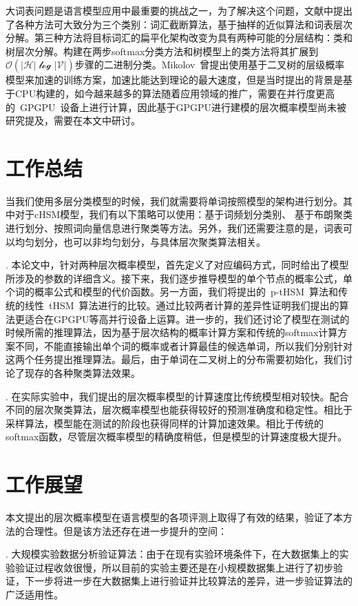 \summary
大词表问题是语言模型应用中最重要的挑战之一，为了解决这个问题，文献中提出了各种方法可大致分为三个类别：词汇截断算法，基于抽样的近似算法和词表层次分解。第三种方法将目标词汇的扁平化架构改变为具有两种可能的分层结构：类和树层次分解。构建在两步softmax分类方法和树模型上的类方法将其扩展到$\mathcal {O(| H | \log | V |)} $步骤的二进制分类。Mikolov~曾提出使用基于二叉树的层级概率模型来加速的训练方案，加速比能达到理论的最大速度，但是当时提出的背景是基于CPU构建的，如今越来越多的算法随着应用领域的推广，需要在并行度更高的~GPGPU~设备上进行计算，因此基于GPGPU进行建模的层次概率模型尚未被研究提及，需要在本文中研讨。
\section*{工作总结}
当我们使用多层分类模型的时候，我们就需要将单词按照模型的架构进行划分。其中对于cHSM模型，我们有以下策略可以使用：基于词频划分类别、 基于布朗聚类进行划分、按照词向量信息进行聚类等方法。另外，我们还需要注意的是，词表可以均匀划分，也可以非均匀划分，与具体层次聚类算法相关。


. 本论文中，针对两种层次概率模型，首先定义了对应编码方式，同时给出了模型所涉及的参数的详细含义。接下来，我们逐步推导模型的单个节点的概率公式，单个词的概率公式和模型的代价函数。另一方面，我们将提出的~p-tHSM~算法和传统的线性~tHSM~算法进行的比较。通过比较两者计算的差异性证明我们提出的算法更适合在GPGPU等高并行设备上运算。进一步的，我们还讨论了模型在测试的时候所需的推理算法，因为基于层次结构的概率计算方案和传统的softmax计算方案不同，不能直接输出单个词的概率或者计算最佳的候选单词，所以我们分别针对这两个任务提出推理算法。最后，由于单词在二叉树上的分布需要初始化，我们讨论了现存的各种聚类算法效果。

. 在实际实验中，我们提出的层次概率模型的计算速度比传统模型相对较快。配合不同的层次聚类算法，层次概率模型也能获得较好的预测准确度和稳定性。相比于采样算法，模型能在测试的阶段也获得同样的计算加速效果。相比于传统的softmax函数，尽管层次概率模型的精确度稍低，但是模型的计算速度极大提升。

\section*{工作展望}
本文提出的层次概率模型在语言模型的各项评测上取得了有效的结果，验证了本方法的合理性。但是该方法还存在进一步提升的空间：

. 大规模实验数据分析验证算法：由于在现有实验环境条件下，在大数据集上的实验验证过程收敛很慢，所以目前的实验主要还是在小规模数据集上进行了初步验证，下一步将进一步在大数据集上进行验证并比较算法的差异，进一步验证算法的广泛适用性。


